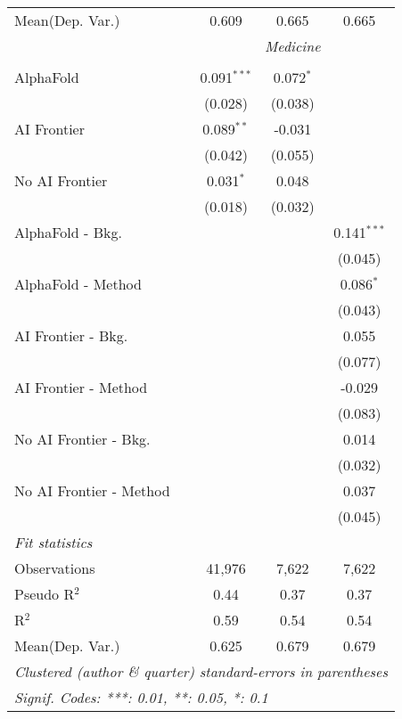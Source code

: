 \begin{tabular}{lccc}
Mean(Dep. Var.) & 0.609 & 0.665 & 0.665 \\
 & \multicolumn{3}{c}{\textit{Medicine}} \\ \\
   AlphaFold               & 0.091$^{***}$ & 0.072$^{*}$ &   \\   
                           & (0.028)       & (0.038)     &   \\   
   AI Frontier             & 0.089$^{**}$  & -0.031      &   \\   
                           & (0.042)       & (0.055)     &   \\   
   No AI Frontier          & 0.031$^{*}$   & 0.048       &   \\   
                           & (0.018)       & (0.032)     &   \\   
   AlphaFold - Bkg.        &               &             & 0.141$^{***}$\\   
                           &               &             & (0.045)\\   
   AlphaFold - Method      &               &             & 0.086$^{*}$\\   
                           &               &             & (0.043)\\   
   AI Frontier - Bkg.      &               &             & 0.055\\   
                           &               &             & (0.077)\\   
   AI Frontier - Method    &               &             & -0.029\\   
                           &               &             & (0.083)\\   
   No AI Frontier - Bkg.   &               &             & 0.014\\   
                           &               &             & (0.032)\\   
   No AI Frontier - Method &               &             & 0.037\\   
                           &               &             & (0.045)\\   
   \midrule
   \emph{Fit statistics}\\
   Observations            & 41,976        & 7,622       & 7,622\\  
   Pseudo R$^2$            & 0.44          & 0.37        & 0.37\\  
   R$^2$                   & 0.59          & 0.54        & 0.54\\  
Mean(Dep. Var.) & 0.625 & 0.679 & 0.679 \\
   \midrule \midrule
   \multicolumn{4}{l}{\emph{Clustered (author \& quarter) standard-errors in parentheses}}\\
   \multicolumn{4}{l}{\emph{Signif. Codes: ***: 0.01, **: 0.05, *: 0.1}}\\
\end{tabular}
\par\endgroup
